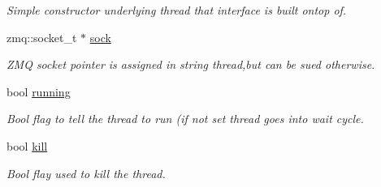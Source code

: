 \begin{DoxyCompactItemize}
\begin{DoxyCompactList}\small\item\em Simple constructor underlying thread that interface is built ontop of. \end{DoxyCompactList}\item 
\hypertarget{structThread__args_a54c977a687fb1a2a82b9e9e42a5ec0f7}{zmq\-::socket\-\_\-t $\ast$ \hyperlink{structThread__args_a54c977a687fb1a2a82b9e9e42a5ec0f7}{sock}}\label{structThread__args_a54c977a687fb1a2a82b9e9e42a5ec0f7}

\begin{DoxyCompactList}\small\item\em Z\-M\-Q socket pointer is assigned in string thread,but can be sued otherwise. \end{DoxyCompactList}\item 
\hypertarget{structThread__args_a9cb8f6b709c5687bf28531bf4d808c75}{bool \hyperlink{structThread__args_a9cb8f6b709c5687bf28531bf4d808c75}{running}}\label{structThread__args_a9cb8f6b709c5687bf28531bf4d808c75}

\begin{DoxyCompactList}\small\item\em Bool flag to tell the thread to run (if not set thread goes into wait cycle. \end{DoxyCompactList}\item 
\hypertarget{structThread__args_a298b8c85c8598ecc557e2090d90a73c3}{bool \hyperlink{structThread__args_a298b8c85c8598ecc557e2090d90a73c3}{kill}}\label{structThread__args_a298b8c85c8598ecc557e2090d90a73c3}

\begin{DoxyCompactList}\small\item\em Bool flay used to kill the thread. \end{DoxyCompactList}\end{DoxyCompactItemize}


